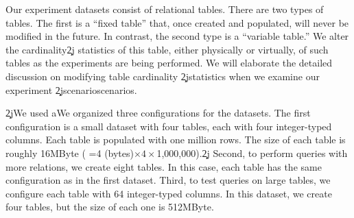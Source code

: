 Our experiment datasets consist of relational tables. There are two types of
tables. The first is a ``fixed table'' that, once created and
populated, will never be modified in the future.  In contrast, the second
type is a ``variable table.'' We alter the cardinality\c2j{ statistics of
  this table}{, either physically or
virtually, of such tables} as the experiments are being performed. We will
elaborate the detailed discussion on modifying table cardinality
\c2j{statistics }{}when we
examine our experiment \c2j{scenario}{scenarios}.

\c2j{We used a}{We organized three configurations for the datasets. The first configuration
is a small} dataset with four tables, each with four integer-typed
columns. Each table is populated with one million rows. The size of each
table is roughly 16MByte ( =4 (bytes)$\times 4 \times$1,000,000).\c2j{}{ Second, to
perform queries with more relations, we create eight tables. In this case,
each table has the same configuration as in the first dataset. Third, to
test queries on large tables, we configure each table with 64 integer-typed
columns. In this dataset, we create four tables, but the size of each one is
512MByte.}

